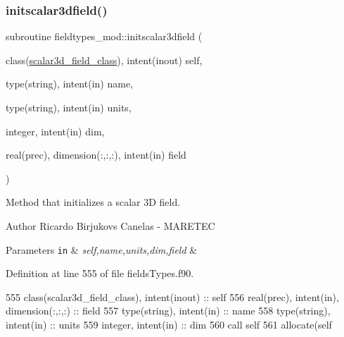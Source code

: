 \subsubsection{\texorpdfstring{initscalar3dfield()}{initscalar3dfield()}}
{\footnotesize\ttfamily subroutine fieldtypes\+\_\+mod\+::initscalar3dfield (\begin{DoxyParamCaption}\item[{class(\mbox{\hyperlink{structfieldtypes__mod_1_1scalar3d__field__class}{scalar3d\+\_\+field\+\_\+class}}), intent(inout)}]{self,  }\item[{type(string), intent(in)}]{name,  }\item[{type(string), intent(in)}]{units,  }\item[{integer, intent(in)}]{dim,  }\item[{real(prec), dimension(\+:,\+:,\+:), intent(in)}]{field }\end{DoxyParamCaption})\hspace{0.3cm}{\ttfamily [private]}}



Method that initializes a scalar 3D field. 

\begin{DoxyAuthor}{Author}
Ricardo Birjukovs Canelas -\/ M\+A\+R\+E\+T\+EC 
\end{DoxyAuthor}

\begin{DoxyParams}[1]{Parameters}
\mbox{\tt in}  & {\em self,name,units,dim,field} & \\
\hline
\end{DoxyParams}


Definition at line 555 of file fields\+Types.\+f90.


\begin{DoxyCode}
555     \textcolor{keywordtype}{class}(scalar3d\_field\_class), \textcolor{keywordtype}{intent(inout)} :: self
556     \textcolor{keywordtype}{real(prec)}, \textcolor{keywordtype}{intent(in)}, \textcolor{keywordtype}{dimension(:,:,:)} :: field
557     \textcolor{keywordtype}{type}(string), \textcolor{keywordtype}{intent(in)} :: name
558     \textcolor{keywordtype}{type}(string), \textcolor{keywordtype}{intent(in)} :: units
559     \textcolor{keywordtype}{integer}, \textcolor{keywordtype}{intent(in)} :: dim
560     \textcolor{keyword}{call }self%
561     \textcolor{keyword}{allocate}(self%
\end{DoxyCode}
\mbox{\label{namespacefieldtypes__mod_a21dba84bb8fdb02d8bf5fd0052b51283}} 
